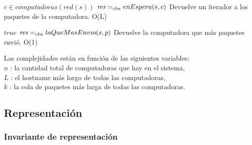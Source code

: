  {$c \in computadoras(red(s))$}
 {$\text{\textit{res}} =_{\mathrm{obs}} enEspera(s,c)$}
 {Devuelve un iterador a los paquetes de la computadora.}
 {O(L)}

 {$true$}
 {$\text{\textit{res}} =_{\mathrm{obs}} laQueMasEnvio(s,p)$}
 {Devuelve la computadora que más paquetes envió.}
 {O(1)}

Las complejidades están en función de las siguientes variables:\\
$n$ : la cantidad total de computadoras que hay en el sistema, \\
$L$ : el hostname más largo de todas las computadoras, \\
$k$ : la cola de paquetes más larga de todas las computadoras. 


\subsection{Representación}


\subsubsection*{Invariante de representación}

